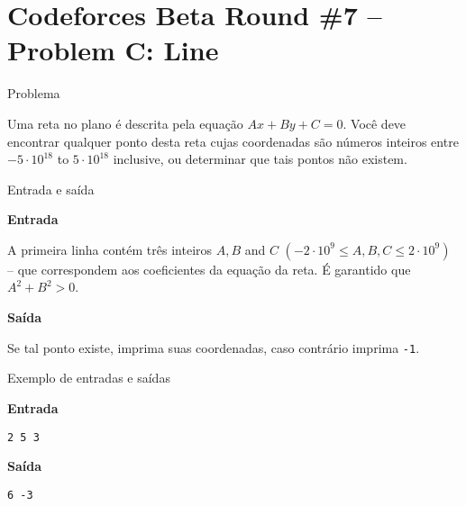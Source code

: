 \section{Codeforces Beta Round \#7 -- Problem C: Line}

\begin{frame}[fragile]{Problema}

Uma reta no plano é descrita pela equação $Ax + By + C = 0$. Você deve encontrar qualquer ponto
desta reta cujas coordenadas são números inteiros entre $-5\cdot 10^{18}$ to $5\cdot 10^{18}$ 
inclusive, ou determinar que tais pontos não existem.

\end{frame}

\begin{frame}[fragile]{Entrada e saída}

\textbf{Entrada}

A primeira linha contém três inteiros $A, B$ and $C$ $(-2\cdot 10^9\leq A, B, C\leq 2\cdot 10^9)$
-- que correspondem aos coeficientes da equação da reta. É garantido que $A^2+ B^2 > 0$.

\vspace{0.1in}

\textbf{Saída}

Se tal ponto existe, imprima suas coordenadas, caso contrário imprima \texttt{-1}.

\end{frame}

\begin{frame}[fragile]{Exemplo de entradas e saídas}

\begin{minipage}[t]{0.5\textwidth}
\textbf{Entrada}
\begin{verbatim}
2 5 3
\end{verbatim}
\end{minipage}
\begin{minipage}[t]{0.45\textwidth}
\textbf{Saída}
\begin{verbatim}
6 -3
\end{verbatim}
\end{minipage}
\end{frame}


